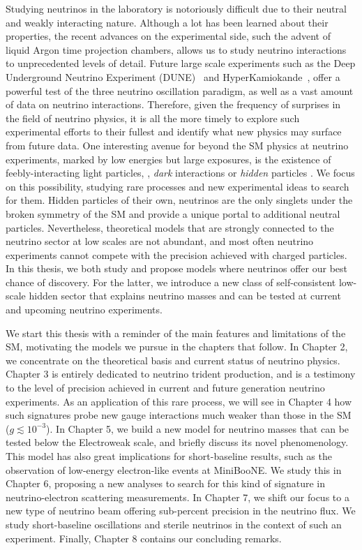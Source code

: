 \documentclass[openany,twoside,frontopenright,chaprunninghead]{ip3thesis}
\begin{document}
Studying neutrinos in the laboratory is notoriously difficult due to their neutral and weakly interacting nature. Although a lot has been learned about their properties, the recent advances on the experimental side, such the advent of liquid Argon time projection chambers, allows us to study neutrino interactions to unprecedented levels of detail. Future large scale experiments such as the Deep Underground Neutrino Experiment (DUNE)~\cite{Acciarri:2015uup} and HyperKamiokande~\cite{Abe:2018uyc}, offer a powerful test of the three neutrino oscillation paradigm, as well as a vast amount of data on neutrino interactions. Therefore, given the frequency of surprises in the field of neutrino physics, it is all the more timely to explore such experimental efforts to their fullest and identify what new physics may surface from future data.  One interesting avenue for beyond the SM physics at neutrino experiments, marked by low energies but large exposures, is the existence of feebly-interacting light particles, \eg, \emph{dark} interactions or \emph{hidden} particles . We focus on this possibility, studying rare processes and new experimental ideas to search for them. Hidden particles of their own, neutrinos are the only singlets under the broken symmetry of the SM and provide a unique portal to additional neutral particles. Nevertheless, theoretical models that are strongly connected to the neutrino sector at low scales are not abundant, and most often neutrino experiments cannot compete with the precision achieved with charged particles. In this thesis, we both study and propose models where neutrinos offer our best chance of discovery. For the latter, we introduce a new class of self-consistent low-scale hidden sector that explains neutrino masses and can be tested at current and upcoming neutrino experiments. 


We start this thesis with a reminder of the main features and limitations of the SM, motivating the models we pursue in the chapters that follow. In Chapter 2, we concentrate on the theoretical basis and current status of neutrino physics. Chapter 3 is entirely dedicated to neutrino trident production, and is a testimony to the level of precision achieved in current and future generation neutrino experiments. As an application of this rare process, we will see in Chapter 4 how such signatures probe new gauge interactions much weaker than those in the SM ($g \lesssim 10^{-3}$). In Chapter 5, we build a new model for neutrino masses that can be tested below the Electroweak scale, and briefly discuss its novel phenomenology. This model has also great implications for short-baseline results, such as the observation of low-energy electron-like events at MiniBooNE. We study this in Chapter 6, proposing a new analyses to search for this kind of signature in neutrino-electron scattering measurements. In Chapter 7, we shift our focus to a new type of neutrino beam offering sub-percent precision in the neutrino flux. We study short-baseline oscillations and sterile neutrinos in the context of such an experiment. Finally, Chapter 8 contains our concluding remarks.    
\end{document}
